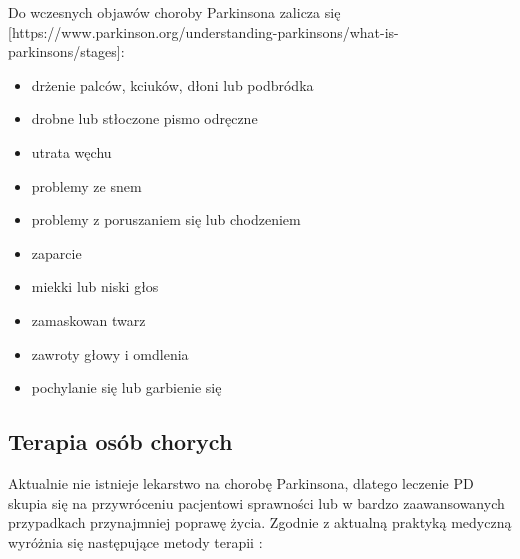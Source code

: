 Do wczesnych objawów choroby Parkinsona zalicza się [https://www.parkinson.org/understanding-parkinsons/what-is-parkinsons/stages]:
\begin{itemize}[itemsep=0.5pt]
	\item drżenie palców, kciuków, dłoni lub podbródka
	\item drobne lub stłoczone pismo odręczne
	\item utrata węchu
	\item problemy ze snem
	\item problemy z poruszaniem się lub chodzeniem
	\item zaparcie
	\item miekki lub niski głos
	\item zamaskowan twarz
	\item zawroty głowy i omdlenia
	\item pochylanie się lub garbienie się
\end{itemize}


\subsection{Terapia osób chorych}
\label{subsec:terapia}
Aktualnie nie istnieje lekarstwo na chorobę Parkinsona, dlatego leczenie PD skupia się na przywróceniu pacjentowi sprawności
lub w bardzo zaawansowanych przypadkach przynajmniej poprawę życia.
Zgodnie z aktualną praktyką medyczną wyróżnia się następujące metody terapii \cite{National_Institute_on_Aging_2022}:

